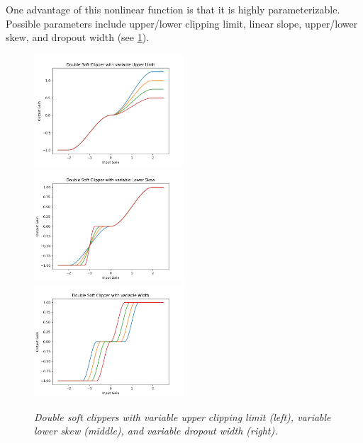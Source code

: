 \documentclass[twoside,a4paper]{article}
\begin{document}
%
One advantage of this nonlinear function is that it is highly
parameterizable. Possible parameters include upper/lower clipping
limit, linear slope, upper/lower skew,  and dropout width (see
\cref{DSCs}).
%
\begin{figure}[ht]
    \includegraphics[width=2.2in]{../DoubleSoftClipper/Pics/VarUpperLim.png}
    \includegraphics[width=2.2in]{../DoubleSoftClipper/Pics/VarLowSkew.png}
    \includegraphics[width=2.2in]{../DoubleSoftClipper/Pics/VarWidth.png}
    \caption{\label{DSCs}{\it Double soft clippers with variable upper clipping
    limit (left), variable lower skew (middle), and variable dropout width (right).}}
\end{figure}
%
\end{document}
